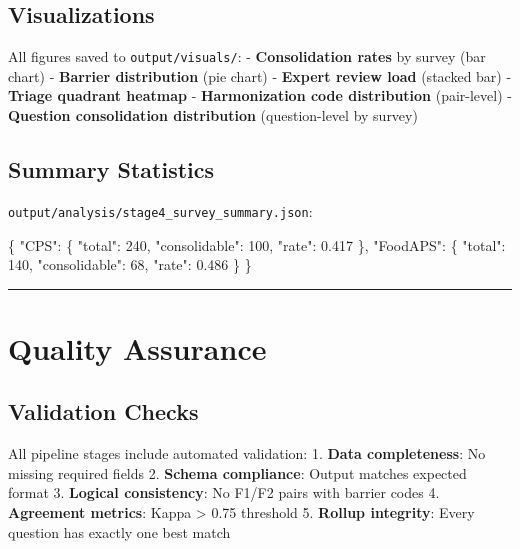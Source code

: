 \documentclass[
  letterpaper,
]{report}
\newenvironment{Shaded}{\begin{snugshade}}{\end{snugshade}}
\newcommand{\DataTypeTok}[1]{\textcolor[rgb]{0.68,0.00,0.00}{#1}}
\newcommand{\DecValTok}[1]{\textcolor[rgb]{0.68,0.00,0.00}{#1}}
\newcommand{\FloatTok}[1]{\textcolor[rgb]{0.68,0.00,0.00}{#1}}
\newcommand{\FunctionTok}[1]{\textcolor[rgb]{0.28,0.35,0.67}{#1}}
\begin{document}
\subsection{Visualizations}\label{visualizations}

All figures saved to \texttt{output/visuals/}: - \textbf{Consolidation
rates} by survey (bar chart) - \textbf{Barrier distribution} (pie chart)
- \textbf{Expert review load} (stacked bar) - \textbf{Triage quadrant
heatmap} - \textbf{Harmonization code distribution} (pair-level) -
\textbf{Question consolidation distribution} (question-level by survey)

\subsection{Summary Statistics}\label{summary-statistics}

\texttt{output/analysis/stage4\_survey\_summary.json}:

\begin{Shaded}
\begin{Highlighting}[]
\FunctionTok{\{}
  \DataTypeTok{"CPS"}\FunctionTok{:} \FunctionTok{\{}
    \DataTypeTok{"total"}\FunctionTok{:} \DecValTok{240}\FunctionTok{,}
    \DataTypeTok{"consolidable"}\FunctionTok{:} \DecValTok{100}\FunctionTok{,}
    \DataTypeTok{"rate"}\FunctionTok{:} \FloatTok{0.417}
  \FunctionTok{\},}
  \DataTypeTok{"FoodAPS"}\FunctionTok{:} \FunctionTok{\{}
    \DataTypeTok{"total"}\FunctionTok{:} \DecValTok{140}\FunctionTok{,}
    \DataTypeTok{"consolidable"}\FunctionTok{:} \DecValTok{68}\FunctionTok{,}
    \DataTypeTok{"rate"}\FunctionTok{:} \FloatTok{0.486}
  \FunctionTok{\}}
\FunctionTok{\}}
\end{Highlighting}
\end{Shaded}

\begin{center}\rule{0.5\linewidth}{0.5pt}\end{center}

\section{Quality Assurance}\label{quality-assurance}

\subsection{Validation Checks}\label{validation-checks}

All pipeline stages include automated validation: 1. \textbf{Data
completeness}: No missing required fields 2. \textbf{Schema compliance}:
Output matches expected format 3. \textbf{Logical consistency}: No F1/F2
pairs with barrier codes 4. \textbf{Agreement metrics}: Kappa
\textgreater{} 0.75 threshold 5. \textbf{Rollup integrity}: Every
question has exactly one best match
\end{document}

